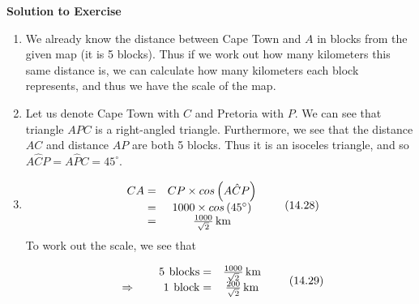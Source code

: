 {\begin{mdframed}[linewidth=4, leftmargin=40, rightmargin=40]
\begin{exercise}
\begin{figure}[H]
\begin{center}
      \vspace{2pt}
    \vspace{.1in}
    \end{center}
 \end{figure}       
        \par 
        \vspace{5pt}
        \label{m39411*solfhsst!!!underscore!!!id1611}\noindent\textbf{Solution to Exercise } \label{m39411*listfhsst!!!underscore!!!id1611}\begin{enumerate}[noitemsep, label=\textbf{Step} \textbf{\arabic*}. ] 
            \leftskip=20pt\rightskip=\leftskip\item  
        \label{m39411*id82688}We already know the distance between Cape Town and $A$ in blocks from the given map (it is 5 blocks). Thus if we work out how many kilometers this same distance is, we can calculate how many kilometers each block represents, and thus we have the scale of the map.\par 
        \item  
        \label{m39411*id82707}Let us denote Cape Town with $C$ and Pretoria with $P$.
We can see that triangle $APC$ is a right-angled triangle. Furthermore, we see that the distance $AC$ and distance $AP$ are both 5 blocks. Thus it is an isoceles triangle, and so $A\hat{C}P=A\hat{P}C={45}^{\circ }$.\par 
        \item  
        \label{m39411*id82816}\nopagebreak\noindent{}
          
    \begin{equation}
    \begin{array}{cc}\hfill CA=& CP\ensuremath{\times}cos\left(A\hat{C}P\right)\\ \hfill =& 1000\ensuremath{\times}cos\left({45}^{\circ }\right)\\ \hfill =& \frac{1000}{\sqrt{2}}\phantom{\rule{0.166667em}{0ex}}\mathrm{km}\end{array}\tag{14.28}
      \end{equation}
        \label{m39411*id82923}To work out the scale, we see that\par 
        \label{m39411*id82929}\nopagebreak\noindent{}
          
    \begin{equation}
    \begin{array}{cc}\hfill 5\phantom{\rule{4pt}{0ex}}\text{blocks}=& \frac{1000}{\sqrt{2}}\phantom{\rule{0.166667em}{0ex}}\text{km}\\ \hfill \ensuremath{\Rightarrow}\phantom{\rule{4pt}{0ex}}\phantom{\rule{4pt}{0ex}}\phantom{\rule{4pt}{0ex}}\phantom{\rule{4pt}{0ex}}\phantom{\rule{4pt}{0ex}}\phantom{\rule{4pt}{0ex}}1\phantom{\rule{4pt}{0ex}}\text{block}=& \frac{200}{\sqrt{2}}\phantom{\rule{0.166667em}{0ex}}\text{km}\end{array}\tag{14.29}
      \end{equation}
        \end{enumerate}
    \end{exercise}
    \end{mdframed}
    }
